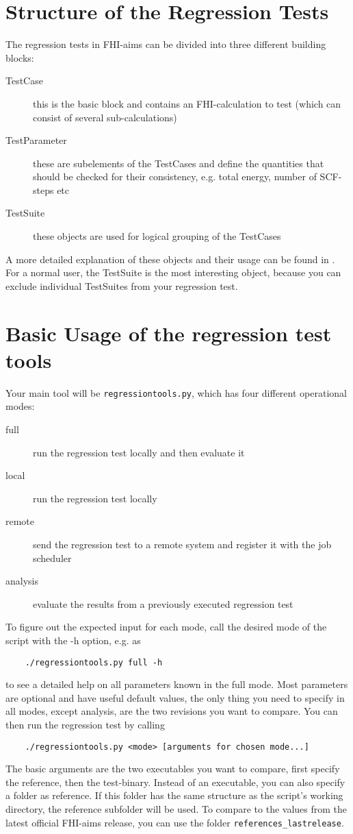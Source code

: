 \documentclass[a4paper,12pt]{scrartcl}
\begin{document}
\section{Structure of the Regression Tests}
The regression tests in FHI-aims can be divided into three different building blocks:
\begin{description}
    \item[TestCase] this is the basic block and contains an FHI-calculation to test (which can consist of several
        sub-calculations)
    \item[TestParameter] these are subelements of the TestCases and define the quantities that should be checked for
        their consistency, e.g. total energy, number of SCF-steps etc
    \item[TestSuite] these objects are used for logical grouping of the TestCases
\end{description}
A more detailed explanation of these objects and their usage can be found in . For a normal user,
the TestSuite is the most interesting object, because you can exclude individual TestSuites from your regression
test.

\section{Basic Usage of the regression test tools}
Your main tool will be \texttt{regressiontools.py}, which has four different operational modes:
\begin{description}
    \item[full] run the regression test locally and then evaluate it
    \item[local] run the regression test locally
    \item[remote] send the regression test to a remote system and register it with the job scheduler
    \item[analysis] evaluate the results from a previously executed regression test
\end{description}
To figure out the expected input for each mode, call the desired mode of the script with the -h option, e.g. as
\begin{verbatim}
    ./regressiontools.py full -h
\end{verbatim}
to see a detailed help on all parameters known in the full mode. Most parameters are optional and have useful default
values, the only thing you need to specify in all modes, except analysis, are the two revisions you want to compare.
You can then run the regression test by calling
\begin{verbatim}
    ./regressiontools.py <mode> [arguments for chosen mode...]
\end{verbatim}
The basic arguments are the two executables you want to compare, first specify the reference, then the test-binary.
Instead of an executable, you can also specify a folder as reference. If this folder has the same structure as the
script's working directory, the reference subfolder will be used. To compare to the values from the latest official
FHI-aims release, you can use the folder \texttt{references\_lastrelease}.
\end{document}
